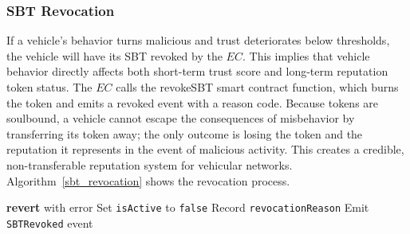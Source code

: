 \cite{cho2010survey}\documentclass[journal,comsoc,twoside]{IEEEtran}
\begin{document}
\subsubsection{SBT Revocation}
If a vehicle’s behavior turns malicious and trust deteriorates below thresholds, the vehicle will have its SBT revoked by the $EC$. This implies that vehicle behavior directly affects both short-term trust score and long-term reputation token status. The $EC$ calls the revokeSBT smart contract function, which burns the token and emits a revoked event with a reason code. Because tokens are soulbound, a vehicle cannot escape the consequences of misbehavior by transferring its token away; the only outcome is losing the token and the reputation it represents in the event of malicious activity. This creates a credible, non-transferable reputation system for vehicular networks.
Algorithm~\ref{sbt_revocation} shows the revocation process.
\begin{algorithm}[!htpb]
\caption{SBT Revocation Logic}
\label{sbt_revocation}
\begin{algorithmic}[1]
        \State \textbf{revert} with error
    \EndIf
    \State Set \texttt{isActive} to \texttt{false}
    \State Record \texttt{revocationReason}
    \State Emit \texttt{SBTRevoked} event
\EndFunction

        \State {}
    \EndIf
\EndFunction
\end{algorithmic}
\end{algorithm}
\end{document}
